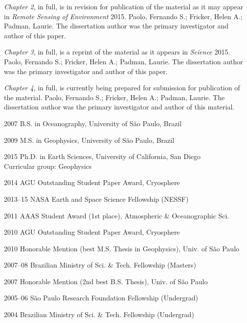 \begin{frontmatter}
\begin{acknowledgements}
{\sl Chapter 2}, in full, is in revision for publication of the material as it
may appear in {\it Remote Sensing of Environment} 2015. Paolo, Fernando S.;
Fricker, Helen A.; Padman, Laurie. The dissertation author was the primary
investigator and author of this paper.

{\sl Chapter 3}, in full, is a reprint of the material as it appears in {\it Science}
2015. Paolo, Fernando S.; Fricker, Helen A.; Padman, Laurie. The dissertation
author was the primary investigator and author of this paper.

{\sl Chapter 4}, in full, is currently being prepared for submission for publication
of the material. Paolo, Fernando S.; Fricker, Helen A.; Padman, Laurie. The
dissertation author was the primary investigator and author of this material.
 
\end{acknowledgements}


%
%
\begin{vitapage}

\begin{vita}
  \item[2007] B.S. in Oceanography, University of S\~ao Paulo, Brazil
  \item[2009] M.S. in Geophysics, University of S\~ao Paulo, Brazil
  \item[2015] Ph.D. in Earth Sciences, University of California, San Diego\\
              Curricular group: Geophysics
\end{vita}

\begin{awards}
  \item[2014] AGU Outstanding Student Paper Award, Cryosphere
  \item[2013--15] NASA Earth and Space Science Fellowship (NESSF)
  \item[2011] AAAS Student Award (1st place), Atmospheric \& Oceanographic Sci.
  \item[2010] AGU Outstanding Student Paper Award, Cryosphere
  \item[2010] Honorable Mention (best M.S. Thesis in Geophysics), Univ. of S\~ao Paulo
  \item[2007--08] Brazilian Ministry of Sci. \& Tech. Fellowship (Masters)
  \item[2007] Honorable Mention (2nd best B.S. Thesis), Univ. of S\~ao Paulo
  \item[2005--06] S\~ao Paulo Research Foundation Fellowship (Undergrad)
  \item[2004] Brazilian Ministry of Sci. \& Tech. Fellowship (Undergrad)
\end{awards}


\end{vitapage}
\end{frontmatter}
